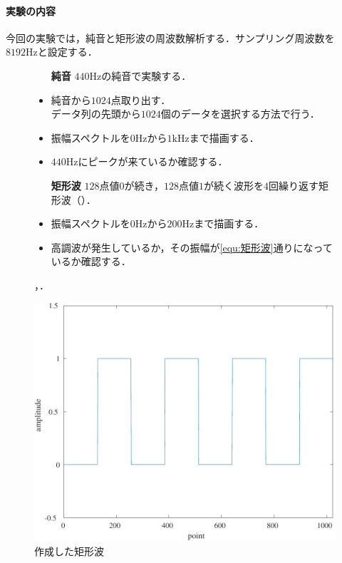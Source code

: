 \paragraph{実験の内容}今回の実験では，純音と矩形波の周波数解析する．サンプリング周波数を\(8192\textrm{Hz}\)と設定する．
\begin{figure}[H]
    \begin{minipage}[c]{.55\textwidth}
        \begin{itemize}
            \item[\textbf{純音}] \(440\textrm{Hz}\)の純音で実験する．
            \item 純音から\(1024\)点取り出す．\\
                  データ列の先頭から\(1024\)個のデータを選択する方法で行う．
            \item 振幅スペクトルを\(0\textrm{Hz}\)から\(1\textrm{kHz}\)まで描画する．
            \item \(440\textrm{Hz}\)にピークが来ているか確認する．
            \item[\textbf{矩形波}] \(128\)点値\(0\)が続き，\(128\)点値\(1\)が続く波形を\(4\)回繰り返す矩形波（）．
            \item 振幅スペクトルを\(0\textrm{Hz}\)から\(200\textrm{Hz}\)まで描画する．
            \item 高調波が発生しているか，その振幅が\eqref{equ:矩形波}通りになっているか確認する．
        \end{itemize}
        \scall{}，．
    \end{minipage}
    \begin{minipage}[c]{.4\textwidth}
        \centering
        \includegraphics[keepaspectratio,width=\textwidth]{../../Figures/02_021.pdf}
        \caption{作成した矩形波}
        \label{fig:作成した矩形波}
    \end{minipage}
\end{figure}
